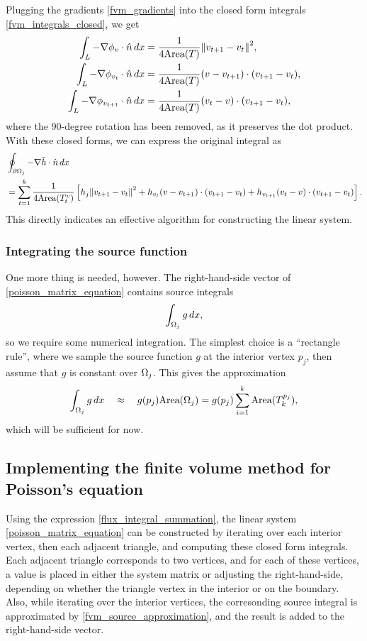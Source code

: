 Plugging the gradients \eqref{fvm_gradients} into the closed form integrals \eqref{fvm_integrals_closed}, we get
\begin{align*}
    \int_L -\nabla\phi_v\cdot\hat{n}\,dx
        &= \frac{1}{4\text{Area}(T)}\norm{v_{t+1} - v_t}^2,\\
    \int_L -\nabla\phi_{v_t}\cdot\hat{n}\,dx
        &= \frac{1}{4\text{Area}(T)}(v - v_{t+1})\cdot(v_{t+1} - v_t),\\
    \int_L -\nabla\phi_{v_{t+1}}\cdot\hat{n}\,dx
        &= \frac{1}{4\text{Area}(T)}(v_t - v)\cdot(v_{t+1} - v_t),
\end{align*}
where the 90-degree rotation has been removed, as it preserves the dot product.
With these closed forms, we can express the original integral as
\begin{equation}\label{flux_integral_summation}
\begin{split}
&\oint_{{\partial\Omega}_j} -\nabla \tilde{h}\cdot\hat{n}\,dx\\
    &=
    \sum_{t=1}^k
        \frac{1}{4\text{Area}(T^v_t)}
        \left[
        h_j \norm{v_{t+1} - v_{t}}^2
        +h_{v_t}(v - v_{t+1})\cdot(v_{t+1} - v_{t})
        +h_{v_{t+1}}(v_t - v)\cdot(v_{t+1} - v_{t})
        \right].
\end{split}
\end{equation}
This directly indicates an effective algorithm for constructing the linear system.

\subsubsection{Integrating the source function}
One more thing is needed, however. The right-hand-side vector of \eqref{poisson_matrix_equation} contains source integrals
    $$\int_{{\Omega}_j}g\,dx,$$
so we require some numerical integration. The simplest choice is a ``rectangle rule'', where we sample the source function $g$ at the interior vertex
$p_j$, then assume that $g$ is constant over ${\Omega}_j$. This gives the approximation
\begin{equation}\label{fvm_source_approximation}
    \int_{{\Omega}_j}g\,dx \quad\approx\quad g(p_j)\text{Area}({\Omega}_j) = g(p_j)\sum_{i=1}^k \text{Area}(T^{p_j}_k),
\end{equation}
which will be sufficient for now.

\subsection{Implementing the finite volume method for Poisson's equation}
Using the expression \eqref{flux_integral_summation}, the linear system
\eqref{poisson_matrix_equation} can be constructed by iterating over each interior vertex, then each adjacent triangle,
and computing these closed form integrals.
Each adjacent triangle corresponds to two vertices, and for each of these vertices,
a value is placed in either the system matrix or adjusting the right-hand-side,
depending on whether the triangle vertex in the interior or on the boundary. Also, while iterating over the interior vertices,
the corresonding source integral is approximated by \eqref{fvm_source_approximation}, and the result is added to the right-hand-side vector.



